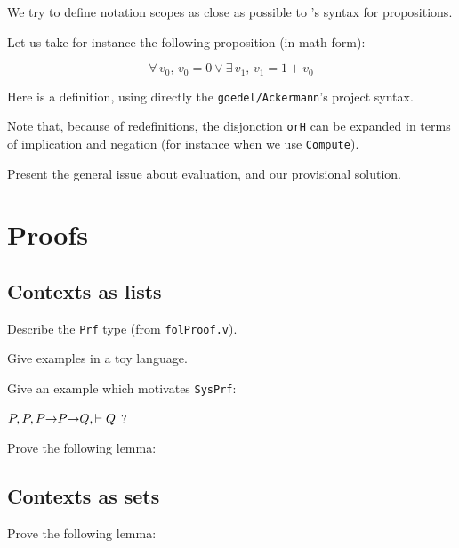 We try to define notation scopes as close as possible to \coq's syntax for propositions.

Let us take for instance the following proposition (in math form):

$$\forall\, v_0,\, v_0=0\vee \exists\,v_1,\,v_1=1+v_0$$

Here is a definition, using directly the \texttt{goedel/Ackermann}'s project syntax.


Note that, because of redefinitions, the disjonction \texttt{orH}
can be expanded in terms of  implication and negation (for instance when we use \texttt{Compute}).

\begin{todo}
  Present the general issue about evaluation, and our provisional solution.
\end{todo}






\section{Proofs}

\subsection{Contexts as lists}
\begin{todo}
Describe the \texttt{Prf} type (from \texttt{folProof.v}).

Give examples in a toy language.

Give an example which motivates \texttt{SysPrf}:

$P,P , P\mbox{$\rightarrow$} P \mbox{$\rightarrow$} Q, \vdash Q$ ?
\end{todo}

\begin{exercise}

Prove the following lemma:

\end{exercise}

\subsection{Contexts as sets}

\begin{exercise}

Prove the following lemma:

\end{exercise}


